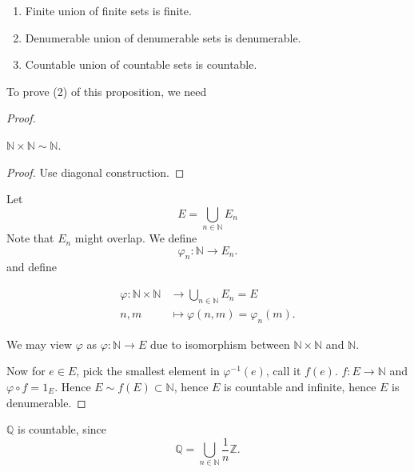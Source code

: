 \begin{proposition}
	\begin{enumerate}
		\item Finite union of finite sets is finite.
		\item Denumerable union of denumerable sets is denumerable.
		\item Countable union of countable sets is countable.
	\end{enumerate}
\end{proposition}
To prove (2) of this proposition, we need
\begin{proof}
	
\begin{lemma}
	$\mathbb{N}\times \mathbb{N}\sim \mathbb{N}$.
\end{lemma}
\begin{proof}
	Use diagonal construction.
\end{proof}


Let
\[
	E = \bigcup_{n \in \mathbb{N}} E_n
\]
Note that $E_n $ might overlap. We define
\[
	\varphi_n: \mathbb{N} \to  E_n
.\] 
and define 

\begin{align*}
	\varphi: \mathbb{N}\times \mathbb{N} &\longrightarrow \bigcup_{n \in \mathbb{N}} E_n = E \\
	n,m &\longmapsto \varphi(n,m) =  \varphi_n(m)
.\end{align*}

We may view $\varphi$ as $\varphi: \mathbb{N} \to E$ due to isomorphism between $\mathbb{N}\times \mathbb{N}$ and $\mathbb{N}$.

Now for $e \in E$, pick the smallest element in $\varphi^{-1}(e)$, call it $f(e)$. $f: E \to  \mathbb{N}$ and $\varphi \circ f = 1_E$. Hence $E \sim f(E) \subset \mathbb{N}$, hence $E$ is countable and infinite, hence $E$ is denumerable.

\end{proof}

\begin{corollary}
	$\mathbb{Q}$ is countable, since \[
		\mathbb{Q} = \bigcup_{n \in \mathbb{N}} \frac{1}{n} \mathbb{Z}
	.\] 
\end{corollary}

